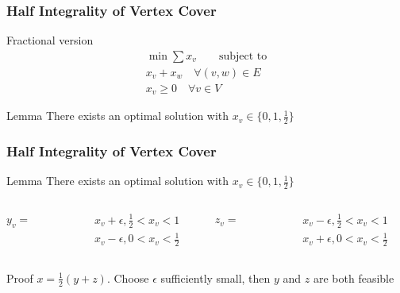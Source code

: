 \documentclass[12pt,aspectratio=169]{beamer}
\begin{document}
 
\begin{frame}\frametitle{Half Integrality of Vertex Cover }
  \begin{block}{Fractional version}
  \begin{equation}
    \begin{split}
      \min \sum x_{v} \qquad\text{subject to}\\
      x_{v} + x_{w}\quad \forall (v,w)\in E\\
      x_{v}\ge 0 \quad \forall v\in V
     \end{split}
   \end{equation}
 \end{block}
 \begin{block}{Lemma}
     There exists an optimal solution with $x_{v}\in \{0, 1, \frac{1}{2}\}$
 \end{block}
\end{frame}

\begin{frame}\frametitle{Half Integrality of Vertex Cover }
 \begin{block}{Lemma}
     There exists an optimal solution with $x_{v}\in \{0, 1, \frac{1}{2}\}$
 \end{block}
\begin{columns} 
  \begin{column}{0.04\textwidth}
      $y_{v} =$
  \end{column}
  \begin{column}{0.3\textwidth}
  \begin{equation}
    \begin{split}
      x_{v} +\epsilon, \frac{1}{2} < x_{v} < 1\\
      x_{v} -\epsilon, 0 < x_{v} < \frac{1}{2}
    \end{split}
  \end{equation}
\end{column}\hfill
  \begin{column}{0.04\textwidth}
      $z_{v} =$
  \end{column}
  \begin{column}{0.3\textwidth}
    \begin{equation}
    \begin{split}
      x_{v} -\epsilon, \frac{1}{2} < x_{v} < 1\\
      x_{v} +\epsilon, 0 < x_{v} < \frac{1}{2}
    \end{split}
  \end{equation}
\end{column}
\end{columns}
 \begin{block}{Proof}
   $x = \frac{1}{2}(y+z)$.
%
   Choose $\epsilon$ sufficiently small, then $y$ and $z$ are both feasible
 \end{block}
\end{frame}
\end{document}
